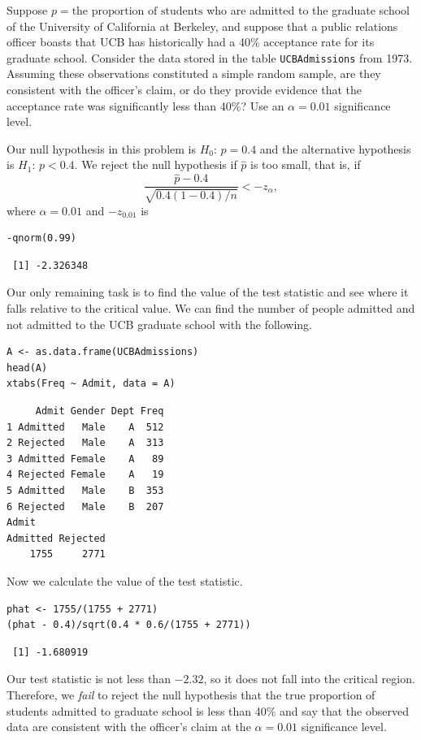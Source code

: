 \documentclass[captions=tableheading]{scrbook}
\begin{document}
\begin{example}

Suppose \(p=\mbox{the proportion of students}\) who are admitted to the graduate school of the University of California at Berkeley, and suppose that a public relations officer boasts that UCB has historically had a 40\% acceptance rate for its graduate school. Consider the data stored in the table \texttt{UCBAdmissions} from 1973. Assuming these observations constituted a simple random sample, are they consistent with the officer's claim, or do they provide evidence that the acceptance rate was significantly less than 40\%? Use an \(\alpha=0.01\) significance level.

Our null hypothesis in this problem is \(H_{0}:\, p=0.4\) and the alternative hypothesis is \(H_{1}:\, p<0.4\). We reject the null hypothesis if \(\hat{p}\) is too small, that is, if
\begin{equation} 
\frac{\hat{p}-0.4}{\sqrt{0.4(1-0.4)/n}}<-z_{\alpha},
\end{equation}
where \(\alpha=0.01\) and \(-z_{0.01}\) is 

\begin{verbatim}
-qnorm(0.99)
\end{verbatim}

\begin{verbatim}
 [1] -2.326348
\end{verbatim}

Our only remaining task is to find the value of the test statistic and see where it falls relative to the critical value. We can find the number of people admitted and not admitted to the UCB graduate school with the following. 


\begin{verbatim}
A <- as.data.frame(UCBAdmissions)
head(A)
xtabs(Freq ~ Admit, data = A)
\end{verbatim}


\begin{verbatim}
     Admit Gender Dept Freq
1 Admitted   Male    A  512
2 Rejected   Male    A  313
3 Admitted Female    A   89
4 Rejected Female    A   19
5 Admitted   Male    B  353
6 Rejected   Male    B  207
Admit
Admitted Rejected 
    1755     2771
\end{verbatim}

Now we calculate the value of the test statistic.


\begin{verbatim}
phat <- 1755/(1755 + 2771)
(phat - 0.4)/sqrt(0.4 * 0.6/(1755 + 2771))
\end{verbatim}

\begin{verbatim}
 [1] -1.680919
\end{verbatim}

Our test statistic is not less than \(-2.32\), so it does not fall into the critical region. Therefore, we \emph{fail} to reject the null hypothesis that the true proportion of students admitted to graduate school is less than 40\% and say that the observed data are consistent with the officer's claim at the \(\alpha=0.01\) significance level. 

\end{example}
\end{document}

